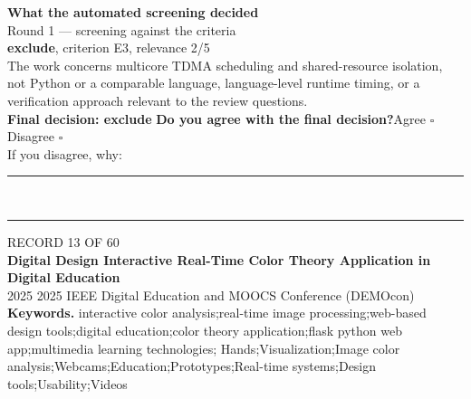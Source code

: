\documentclass[11pt,a4paper]{article}
\begin{document}
\vspace{3mm}
\vspace{2.5mm}
{\small\textbf{What the automated screening decided}}\\[2mm]
{\footnotesize\color{soft}Round 1 --- screening against the criteria}\\[0.5mm]
{\small\textbf{exclude}, criterion E3, relevance 2/5}\\[0.5mm]
{\small The work concerns multicore TDMA scheduling and shared-resource isolation, not Python or a comparable language, language-level runtime timing, or a verification approach relevant to the review questions.}\\[2.5mm]
{\small\textbf{Final decision: exclude}}
\vspace{2mm}
{\small\textbf{Do you agree with the final decision?}\quad{}Agree $\square$\qquad{}Disagree $\square$}\\[1mm]
{\footnotesize\color{soft}If you disagree, why:}\\[1mm]
\color{rule}\rule{\linewidth}{0.3pt}\\[3mm]\rule{\linewidth}{0.3pt}\color{black}
\clearpage
{\color{soft}\footnotesize RECORD 13 OF 60}\\[1mm]
{\large\bfseries Digital Design Interactive Real-Time Color Theory Application in Digital Education}\\[1.5mm]
{\color{soft}\small 2025 \textperiodcentered{} 2025 IEEE Digital Education and MOOCS Conference (DEMOcon)}\\[2mm]
{\small\textbf{Keywords.} interactive color analysis;real-time image processing;web-based design tools;digital education;color theory application;flask python web app;multimedia learning technologies; Hands;Visualization;Image color analysis;Webcams;Education;Prototypes;Real-time systems;Design tools;Usability;Videos}\\[2mm]
\end{document}
